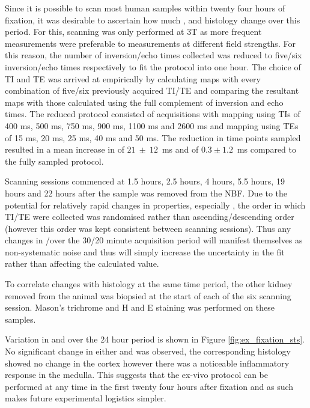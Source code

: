 Since it is possible to scan most human samples within twenty four hours of fixation, it was desirable to ascertain how much \tone, \ttwostar and histology change over this period. For this, scanning was only performed at 3T as more frequent measurements were preferable to measurements at different field strengths. For this reason, the number of inversion/echo times collected was reduced to five/six inversion/echo times respectively to fit the protocol into one hour. The choice of \ac{TI} and \ac{TE} was arrived at empirically by calculating maps with every combination of five/six previously acquired \ac{TI}/\ac{TE} and comparing the resultant maps with those calculated using the full complement of inversion and echo times. The reduced protocol consisted of acquisitions with \tone mapping using \acp{TI} of 400 ms, 500 ms, 750 ms, 900 ms, 1100 ms and 2600 ms and \ttwostar mapping using \acp{TE} of 15 ms, 20 ms, 25 ms, 40 ms and 50 ms. The reduction in time points sampled resulted in a mean increase in \tone of $21~\pm~12$~ms and \ttwostar of $0.3 \pm 1.2$~ms compared to the fully sampled protocol.

Scanning sessions commenced at 1.5 hours, 2.5 hours, 4 hours, 5.5 hours, 19 hours and 22 hours after the sample was removed from the \ac{NBF}. Due to the potential for relatively rapid changes in properties, especially \tone, the order in which \ac{TI}/\ac{TE} were collected was randomised rather than ascending/descending order (however this order was kept consistent between scanning sessions). Thus any changes in \tone/\ttwostar over the 30/20 minute acquisition period will manifest themselves as non-systematic noise and thus will simply increase the uncertainty in the fit rather than affecting the calculated value.

To correlate changes with histology at the same time period, the other kidney removed from the animal was biopsied at the start of each of the six scanning session. Mason's trichrome and \ac{H and E} staining was performed on these samples.

Variation in \tone and \ttwostar over the 24 hour period is shown in Figure \ref{fig:ex_fixation_sts}. No significant change in either \tone and \ttwostar was observed, the corresponding histology showed no change in the cortex however there was a noticeable inflammatory response in the medulla. This suggests that the ex-vivo protocol can be performed at any time in the first twenty four hours after fixation and as such makes future experimental logistics simpler.

